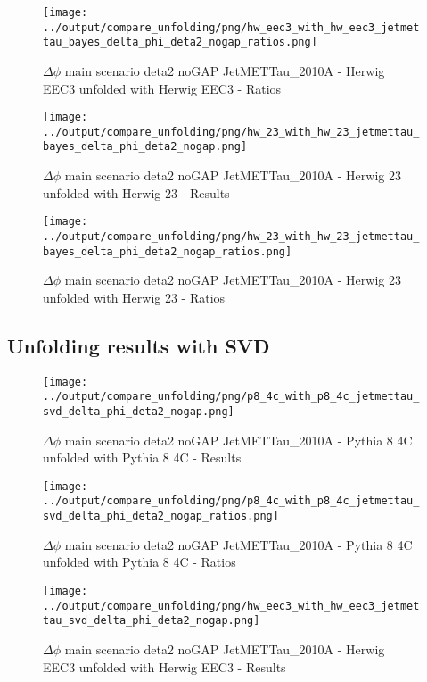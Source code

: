 \documentclass[11pt]{book}
\begin{document}
\begin{figure}[ht]
\centering
\texttt{[image: ../output/compare\_unfolding/png/hw\_eec3\_with\_hw\_eec3\_jetmettau\_bayes\_delta\_phi\_deta2\_nogap\_ratios.png]}
\caption{$\Delta\phi$ main scenario deta2 noGAP JetMETTau\_2010A - Herwig EEC3 unfolded with Herwig EEC3 - Ratios}
\label{hw_eec3_hw_eec3_jetmettau_bayes_delta_phi_deta2_nogap_b}
\end{figure}

\begin{figure}[ht]
\centering
\texttt{[image: ../output/compare\_unfolding/png/hw\_23\_with\_hw\_23\_jetmettau\_bayes\_delta\_phi\_deta2\_nogap.png]}
\caption{$\Delta\phi$ main scenario deta2 noGAP JetMETTau\_2010A - Herwig 23 unfolded with Herwig 23 - Results}
\label{hw_23_hw_23_jetmettau_bayes_delta_phi_deta2_nogap_a}
\end{figure}

\begin{figure}[ht]
\centering
\texttt{[image: ../output/compare\_unfolding/png/hw\_23\_with\_hw\_23\_jetmettau\_bayes\_delta\_phi\_deta2\_nogap\_ratios.png]}
\caption{$\Delta\phi$ main scenario deta2 noGAP JetMETTau\_2010A - Herwig 23 unfolded with Herwig 23 - Ratios}
\label{hw_23_hw_23_jetmettau_bayes_delta_phi_deta2_nogap_b}
\end{figure}

\clearpage
\subsection{Unfolding results with SVD}

\begin{figure}[ht]
\centering
\texttt{[image: ../output/compare\_unfolding/png/p8\_4c\_with\_p8\_4c\_jetmettau\_svd\_delta\_phi\_deta2\_nogap.png]}
\caption{$\Delta\phi$ main scenario deta2 noGAP JetMETTau\_2010A - Pythia 8 4C unfolded with Pythia 8 4C - Results}
\label{p8_p8_jetmettau_svd_delta_phi_deta2_nogap_a}
\end{figure}

\begin{figure}[ht]
\centering
\texttt{[image: ../output/compare\_unfolding/png/p8\_4c\_with\_p8\_4c\_jetmettau\_svd\_delta\_phi\_deta2\_nogap\_ratios.png]}
\caption{$\Delta\phi$ main scenario deta2 noGAP JetMETTau\_2010A - Pythia 8 4C unfolded with Pythia 8 4C - Ratios}
\label{p8_p8_jetmettau_svd_delta_phi_deta2_nogap_b}
\end{figure}

\begin{figure}[ht]
\centering
\texttt{[image: ../output/compare\_unfolding/png/hw\_eec3\_with\_hw\_eec3\_jetmettau\_svd\_delta\_phi\_deta2\_nogap.png]}
\caption{$\Delta\phi$ main scenario deta2 noGAP JetMETTau\_2010A - Herwig EEC3 unfolded with Herwig EEC3 - Results}
\label{hw_eec3_hw_eec3_jetmettau_svd_delta_phi_deta2_nogap_a}
\end{figure}
\end{document}
